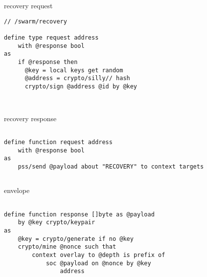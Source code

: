 
\begin{definition}{recovery request}\label{def:recovery-request}
\begin{lstlisting}[language=buzz1]
// /swarm/recovery

define type request address
    with @response bool
as  
    if @response then
      @key = local keys get random
      @address = crypto/silly// hash                        
      crypto/sign @address @id by @key 
    
    

\end{lstlisting}
\end{definition}

\begin{definition}{recovery response}\label{def:recovery}
\begin{lstlisting}[language=buzz1]

define function request address
    with @response bool
as                                                      
    pss/send @payload about "RECOVERY" to context targets
    

\end{lstlisting}
\end{definition}

\begin{definition}{envelope}\label{def:recovery-response}
\begin{lstlisting}[language=buzz1]

define function response []byte as @payload
    by @key crypto/keypair
as
    @key = crypto/generate if no @key 
    crypto/mine @nonce such that
        context overlay to @depth is prefix of 
            soc @payload on @nonce by @key
                address 


\end{lstlisting}
\end{definition}
   